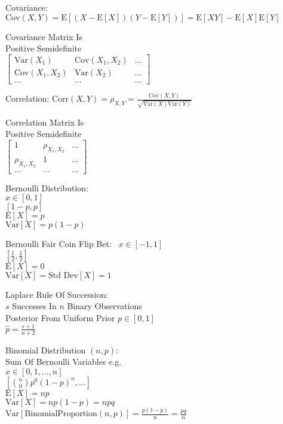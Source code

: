 Covariance: $\text{Cov}(X,Y)=\text{E}[(X-\text{E}[X])(Y-\text{E}[Y])]=\text{E}[XY]-\text{E}[X]\text{E}[Y]$

Covariance Matrix Is \\
Positive Semidefinite \\
$
\begin{bmatrix}
\text{Var}(X_1) & \text{Cov}(X_1,X_2) & \dots \\
\text{Cov}(X_1,X_2) & \text{Var}(X_2) & \dots \\
\dots & \dots & \dots
\end{bmatrix}
$

Correlation: $\text{Corr}(X,Y)=\rho_{X,Y}=\frac{\text{Cov}(X,Y)}{\sqrt{\text{Var}(X)\text{Var}(Y)}}$

Correlation Matrix Is \\
Positive Semidefinite \\
$
\begin{bmatrix}
1 & \rho_{X_1,X_2} & \dots \\
\rho_{X_1,X_2} & 1 & \dots \\
\dots & \dots & \dots
\end{bmatrix}
$

Bernoulli Distribution: \\
$x \in [0,1]$ \\
$[1-p,p]$ \\
$\text{E}[X]=p$ \\
$\text{Var}[X]=p(1-p)$

Bernoulli Fair Coin Flip Bet: \
$x \in [-1,1]$ \\
$\left[\frac{1}{2},\frac{1}{2}\right]$ \\
$\text{E}[X]=0$ \\
$\text{Var}[X]=\text{Std Dev}[X]=1$

Laplace Rule Of Succession: \\
$s$ Successes In $n$ Binary Observations \\
Posterior From Uniform Prior $p \in [0,1]$ \\
$\hat{p}=\frac{s+1}{n+2}$

Binomial Distribution $(n,p)$: \\
Sum Of Bernoulli Variables e.g. \\
$x \in [0,1,\dots,n]$ \\
$[\binom{n}{0}p^0(1-p)^n,\dots]$ \\
$\text{E}[X]=np$ \\
$\text{Var}[X]=np(1-p)=npq$ \\
$\text{Var}[\text{BinomialProportion}(n,p)]=\frac{p(1-p)}{n}=\frac{pq}{n}$

